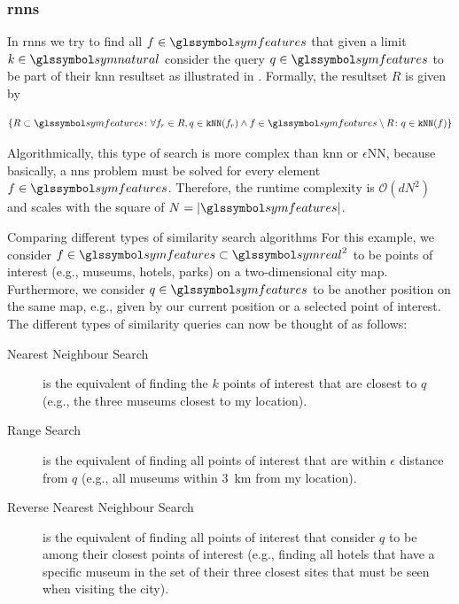 \subsubsection{\texorpdfstring{\acrfull{rnns}}{Reverse Nearest Neighbour Search (RNNS)}}

In \acrshort{rnns} \cite{Korn:2000Influence} we try to find all $f \in \symfeatures$ that given a limit $k \in \symnatural$ consider the query $q \in \symfeatures$ to be part of their \acrshort{knn} resultset as illustrated in . Formally, the resultset $R$ is given by  

\begin{equation}
    \label{eq:rknn}
    \lbrace R \subset \symfeatures \colon \forall f_r \in R, q \in \texttt{kNN}(f_r) \wedge f \in \symfeatures \setminus R \colon q \in \texttt{kNN}(f)  \rbrace
\end{equation}

Algorithmically, this type of search is more complex than \acrshort{knn} or $\epsilon$NN, because basically, a \acrshort{nns} problem must be solved for every element $f \in \symfeatures$. Therefore, the runtime complexity is $\mathcal{O}(dN^2)$ and scales with the square of $N = |\symfeatures|$. 

\begin{example}[label=example:similarity_search]{Comparing different types of similarity search algorithms}{}
    For this example, we consider $f \in \symfeatures \subset \symreal^2$ to be points of interest (e.g., museums, hotels, parks) on a two-dimensional city map. Furthermore, we consider $q \in \symfeatures$ to be another position on the same map, e.g., given by our current position or a selected point of interest. The different types of similarity queries can now be thought of as follows:

    \begin{description}
        \item[Nearest Neighbour Search] is the equivalent of finding the $k$ points of interest that are closest to $q$ (e.g., the three museums closest to my location).
        \item[Range Search] is the equivalent of finding all points of interest that are within $\epsilon$ distance from  $q$ (e.g., all museums within \SI{3}{km} from my location).
        \item[Reverse Nearest Neighbour Search] is the equivalent of finding all points of interest that consider $q$ to be among their closest points of interest (e.g., finding all hotels that have a specific museum in the set of their three closest sites that must be seen when visiting the city).
    \end{description}
\end{example}

